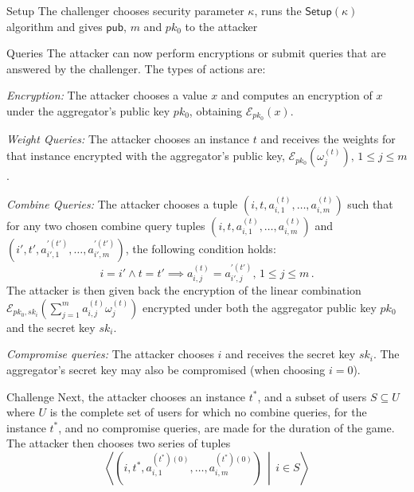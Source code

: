 \documentclass[10pt,letterpaper,oneside,twocolumn,journal]{IEEEtran}
\theoremstyle{definition}
\theoremstyle{definition}
\theoremstyle{remark}
\begin{document}
\begin{LaTeXdescription}
    \item[Setup] The challenger chooses security parameter $\kappa$, runs the $\mathsf{Setup}(\kappa)$ algorithm and gives $\mathsf{pub}$, $m$ and $pk_0$ to the attacker
    \item[Queries] The attacker can now perform encryptions or submit queries that are answered by the challenger. The types of actions are:
    \begin{LaTeXenumerate}
        \item \textit{Encryption:} The attacker chooses a value $x$ and computes an encryption of $x$ under the aggregator's public key $pk_0$, obtaining $\mathcal{E}_{pk_0}(x)$.
        \item \textit{Weight Queries:} The attacker chooses an instance $t$ and receives the weights for that instance encrypted with the aggregator's public key, $\mathcal{E}_{pk_0}(\omega^{(t)}_{j}),\,1\leq j\leq m$.
        \item \textit{Combine Queries:} The attacker chooses a tuple $(i,t,a^{(t)}_{i,1},\dots,a^{(t)}_{i,m})$ such that for any two chosen combine query tuples $(i,t,a^{(t)}_{i,1},\dots,a^{(t)}_{i,m})$ and $(i',t',a^{\prime(t')}_{i',1},\dots,a^{\prime(t')}_{i',m})$, the following condition holds:
        \begin{equation*}
            i = i' \wedge t = t' \implies a^{(t)}_{i,j} = a^{\prime(t')}_{i',j},\,1\leq j\leq m\,.
        \end{equation*}
        The attacker is then given back the encryption of the linear combination $\mathcal{E}_{pk_0,sk_i}(\sum^m_{j=1}a^{(t)}_{i,j}\omega^{(t)}_j)$ encrypted under both the aggregator public key $pk_0$ and the secret key $sk_i$.
        \item \textit{Compromise queries:} The attacker chooses $i$ and receives the secret key $sk_i$. The aggregator's secret key may also be compromised (when choosing $i=0$).
    \end{LaTeXenumerate} 
    \item[Challenge] Next, the attacker chooses an instance $t^*$, and a subset of users $S \subseteq U$ where $U$ is the complete set of users for which no combine queries, for the instance $t^*$, and no compromise queries, are made for the duration of the game. The attacker then chooses two series of tuples
    \begin{equation*}
        \left\langle\left(i,t^*,a^{(t^*)(0)}_{i,1},\dots,a^{(t^*)(0)}_{i,m}\right)\,\middle|\,i \in S\right\rangle

\end{equation*}
\end{LaTeXdescription}
\end{document}
